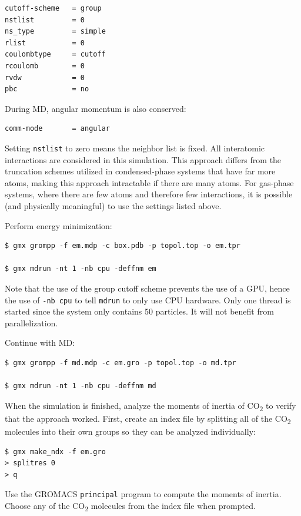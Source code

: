 \documentclass[9pt,tutorial,pubversion]{livecoms}
\begin{document}
\begin{lstlisting}
cutoff-scheme   = group
nstlist         = 0
ns_type         = simple
rlist           = 0
coulombtype     = cutoff
rcoulomb        = 0
rvdw            = 0
pbc             = no
\end{lstlisting}
%
During MD, angular momentum is also conserved:
%
\begin{lstlisting}
comm-mode       = angular
\end{lstlisting}
%
Setting \texttt{nstlist} to zero means the neighbor list is fixed. All interatomic interactions are considered in this simulation. This approach differs from the truncation schemes utilized in condensed-phase systems that have far more atoms, making this approach intractable if there are many atoms. For gas-phase systems, where there are few atoms and therefore few interactions, it is possible (and physically meaningful) to use the settings listed above.

Perform energy minimization:

\begin{lstlisting}
$ gmx grompp -f em.mdp -c box.pdb -p topol.top -o em.tpr

$ gmx mdrun -nt 1 -nb cpu -deffnm em
\end{lstlisting}
%
Note that the use of the group cutoff scheme prevents the use of a GPU, hence the use of \texttt{-nb cpu} to tell \texttt{mdrun} to only use CPU hardware. Only one thread is started since the system only contains 50 particles. It will not benefit from parallelization.

Continue with MD:

\begin{lstlisting}
$ gmx grompp -f md.mdp -c em.gro -p topol.top -o md.tpr

$ gmx mdrun -nt 1 -nb cpu -deffnm md
\end{lstlisting}

When the simulation is finished, analyze the moments of inertia of CO\textsubscript{2} to verify that the approach worked. First, create an index file by splitting all of the CO\textsubscript{2} molecules into their own groups so they can be analyzed individually:

\begin{lstlisting}
$ gmx make_ndx -f em.gro
> splitres 0
> q
\end{lstlisting}

Use the GROMACS \texttt{principal} program to compute the moments of inertia. Choose any of the CO\textsubscript{2} molecules from the index file when prompted.
\end{document}
